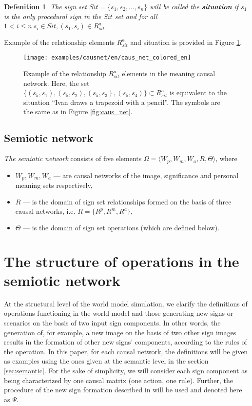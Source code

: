 \documentclass[12pt]{scrartcl}
\newtheorem{definition}{Defenition}
\begin{document}
	\begin{definition}
		The sign set $Sit=\{s_1,s_2,\dots,s_n\}$ will be called the \textbf{situation} if $s_1$ is the only procedural sign in the $Sit$ set and for all $1<i\leq n\ s_i\in Sit, (s_1,s_i)\in R_{sit}^a$.
	\end{definition}
	
	Example of the relationship elements $R_{sit}^a$ and situation is provided in Figure \ref{fig:mean_relat}.
	
	\begin{figure}[h]
		\centering
		\texttt{[image: examples/causnet/en/caus\_net\_colored\_en]}
		\caption{Example of the relationship $R_{sit}^a$ elements in the meaning causal network. Here, the set $\{(s_5,s_1),(s_5,s_2),(s_5,s_3),(s_5,s_4)\}\subset R_{sit}^a$ is equivalent to the situation ``Ivan draws a trapezoid with a pencil''. The symbols are the same as in Figure \ref{fig:caus_net}.}
			\label{fig:mean_relat}		
	\end{figure}
			
	\subsection{Semiotic network}
	\textit{The semiotic network} consists of five elements $\Omega=\langle W_p, W_m, W_a, R, \Theta \rangle$, where
	\begin{itemize}
		\item $W_p, W_m, W_a$ --- are causal networks of the image, significance and personal meaning sets respectively,
		\item $R$ --- is the domain of sign set relationships formed on the basis of three causal networks, i.e.  $R=\{R^p, R^m, R^a\}$,
		\item $\Theta$ --- is the domain of sign set operations (which are defined below).
	\end{itemize} 
	

	\section{The structure of operations in the semiotic network }\label{sec:operations}
	At the structural level of the world model simulation, we clarify the definitions of operations functioning in the world model and those generating new signs or scenarios on the basis of two input sign components. In other words, the generation of, for example, a new image on the basis of two other sign images results in the formation of other new signs' components, according to the rules of the operation. In this paper, for each causal network, the definitions will be given as examples using the ones given at the semantic level in the section \ref{sec:semantic}. For the sake of simplicity, we will consider each sign component as being characterized by one causal matrix (one action, one rule). Further, the procedure of the new sign formation described in \cite{Osipov2014c} will be used and denoted here as $\Psi$.
		
\end{document}
